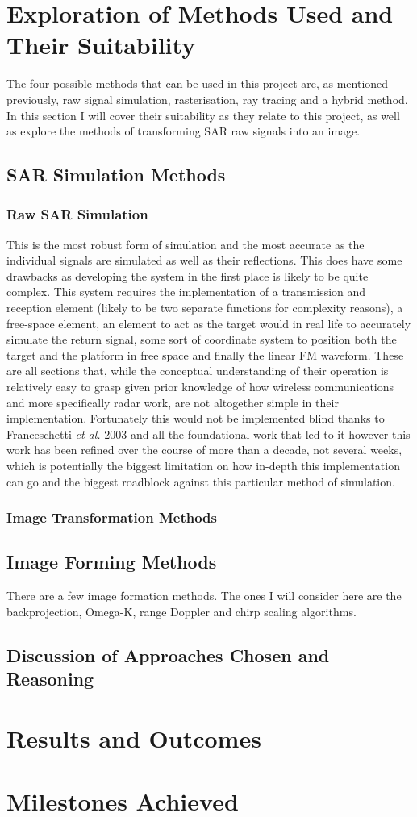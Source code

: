 \section{Exploration of Methods Used and Their Suitability}
\label{sec:method_exploration}
The four possible methods that can be used in this project are, as mentioned previously, raw signal simulation, rasterisation, ray tracing and a hybrid method. In this section I will cover their suitability as they relate to this project, as well as explore the methods of transforming SAR raw signals into an image.
\subsection{SAR Simulation Methods}
\subsubsection{Raw SAR Simulation}
This is the most robust form of simulation and the most accurate as the individual signals are simulated as well as their reflections. This does have some drawbacks as developing the system in the first place is likely to be quite complex. This system requires the implementation of a transmission and reception element (likely to be two separate functions for complexity reasons), a free-space element, an element to act as the target would in real life to accurately simulate the return signal, some sort of coordinate system to position both the target and the platform in free space and finally the linear FM waveform. These are all sections that, while the conceptual understanding of their operation is relatively easy to grasp given prior knowledge of how wireless communications and more specifically radar work, are not altogether simple in their implementation. Fortunately this would not be implemented blind thanks to Franceschetti \textit{et al.} 2003 \cite{franceschettiSARRawSignal2003} and all the foundational work that led to it however this work has been refined over the course of more than a decade, not several weeks, which is potentially the biggest limitation on how in-depth this implementation can go and the biggest roadblock against this particular method of simulation. 
\subsubsection{Image Transformation Methods}

\subsection{Image Forming Methods}
There are a few image formation methods. The ones I will consider here are the backprojection, Omega-K, range Doppler and chirp scaling algorithms. 
\subsection{Discussion of Approaches Chosen and Reasoning}
\section{Results and Outcomes}
\section{Milestones Achieved}